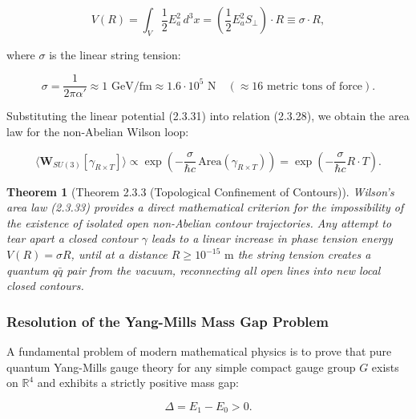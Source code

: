 \documentclass[11pt,a4paper]{article}
\newtheorem{theorem}{Theorem}[section]
\theoremstyle{definition}
\begin{document}
\begin{equation}\label{eq:2.3.31}\tag{2.3.31}
V(R) = \int_{V} \frac{1}{2} E_a^2 \, d^3x = \left( \frac{1}{2} E_a^2 S_\perp \right) \cdot R \equiv \sigma \cdot R,
\end{equation}

where $\sigma$ is the linear string tension:

\begin{equation}\label{eq:2.3.32}\tag{2.3.32}
\sigma = \frac{1}{2\pi \alpha'} \approx 1\text{ GeV/fm} \approx 1.6 \cdot 10^5\text{ N} \quad (\approx 16\text{ metric tons of force}).
\end{equation}

Substituting the linear potential (2.3.31) into relation (2.3.28), we obtain the area law for the non-Abelian Wilson loop:

\begin{equation}\label{eq:2.3.33}\tag{2.3.33}
\langle \mathbf{W}_{SU(3)}[\gamma_{R \times T}] \rangle \propto \exp\left( - \frac{\sigma}{\hbar c} \, \text{Area}(\gamma_{R \times T}) \right) = \exp\left( - \frac{\sigma}{\hbar c} R \cdot T \right).
\end{equation}

\begin{theorem}[Theorem 2.3.3 (Topological Confinement of Contours)]\label{thm:2.3.3}
Wilson's area law (2.3.33) provides a direct mathematical criterion for the impossibility of the existence of isolated open non-Abelian contour trajectories. Any attempt to tear apart a closed contour $\gamma$ leads to a linear increase in phase tension energy $V(R) = \sigma R$, until at a distance $R \ge 10^{-15}\text{ m}$ the string tension creates a quantum $q\bar{q}$ pair from the vacuum, reconnecting all open lines into new local closed contours.
\end{theorem}

\subsubsection{Resolution of the Yang-Mills Mass Gap Problem}\label{sec:2.3.6}

A fundamental problem of modern mathematical physics is to prove that pure quantum Yang-Mills gauge theory for any simple compact gauge group $G$ exists on $\mathbb{R}^4$ and exhibits a strictly positive mass gap:

\begin{equation}\label{eq:2.3.34}\tag{2.3.34}
\Delta = E_1 - E_0 > 0.
\end{equation}
\end{document}
